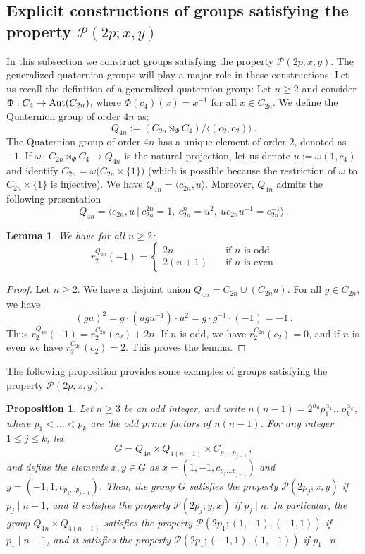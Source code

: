 \documentclass[12pt]{amsart}
\numberwithin{equation}{section}
\newcommand{\Aut}{{\rm Aut}}
\newtheorem{lem}[X]{Lemma}
\newtheorem{prop}[X]{Proposition}
\theoremstyle{definition}
\theoremstyle{remark}
\begin{document}
\subsection{Explicit constructions of groups satisfying the property $\mathcal{P}(2p;x,y)$}\label{subsec:Prop(2p)}
In this subsection we construct groups satisfying the property $\mathcal{P}(2p;x,y)$. The generalized quaternion groups will play a major role in these constructions. Let us recall the definition of a generalized quaternion group: Let $n\ge 2$ and consider $\Phi: C_4\to \Aut(C_{2n})$, where $\Phi(c_4)(x)=x^{-1}$ for all $x\in C_{2n}$. We define the Quaternion group of order $4n$ as:
\begin{equation}
    Q_{4n}:= (C_{2n} \rtimes_{\Phi}C_4)/\langle(c_2,c_2)\rangle\, .
\end{equation}
The Quaternion group of order $4n$ has a unique element of order $2$, denoted as $-1$. If $\omega\, \colon\,  C_{2n} \rtimes_{\Phi}C_4\to Q_{4n}$ is the natural projection, let us denote $u:=\omega(1,c_4)$ and identify $C_{2n}=\omega\bigl( C_{2n}\times\{1\}\bigr)$ (which is possible because the restriction of $\omega$ to $C_{2n}\times \{1\}$ is injective). We have $Q_{4n}=\langle c_{2n}, u\rangle$. Moreover, $Q_{4n}$ admits the following presentation \[ Q_{4n}=\bigl\langle c_{2n},u \ |\ c_{2n}^{2n}=1,\  c_{2n}^{n}=u^2,\ uc_{2n}u^{-1}=c_{2n}^{-1}\bigr\rangle\, .\]
\begin{lem}\label{rootsnumberinQ4n}
    We have for all $n\ge 2$: 
    \[ r_2^{Q_{4n}}(-1)=\begin{cases}
        2n\quad&\text{if } n\text{ is odd}\\
        2(n+1)\quad &\text{if }n\text{ is even}
    \end{cases}\]
\end{lem}
\begin{proof}
    Let $n\ge2$. We have a disjoint union $Q_{4n}=C_{2n} \cup (C_{2n} u)$. For all $g\in C_{2n}$, we have \[(gu)^2=g\cdot (ugu^{-1}) \cdot u^2=g\cdot g^{-1} \cdot (-1)=-1\, .\]
    Thus $r_2^{Q_{4n}}(-1)=r_{2}^{C_{2n}}(c_2)+2n$. If $n$ is odd, we have $r_2^{C_{2n}}(c_{2})=0$, and if $n$ is even we have $r_2^{C_{2n}}(c_{2})=2$. This proves the lemma.
\end{proof}
\noindent The following proposition provides some examples of groups satisfying the property $\mathcal{P}(2p;x,y)$.
\begin{prop}\label{general-construction}
    Let $n\ge 3$ be an odd integer, and write $n(n-1)=2^{\alpha_0} p_1^{\alpha_1}\dots p_k^{\alpha_k}$, where $p_1<\dots<p_k$ are the odd prime factors of $n(n-1)$. For any integer $1\le j\le k$, let 
    \[ G=Q_{4n}\times Q_{4(n-1)}\times C_{p_1\dots p_{j-1}}\, , \]
    and define the elements $x,y\in G$ as $x=(1,-1,c_{p_1\dots p_{j-1}})$ and $y=(-1,1,c_{p_1\dots p_{j-1}})$. Then, the group $G$ satisfies the property $\mathcal{P}(2p_j;x,y)$ if $p_j \mid n-1$, and it satisfies the property $\mathcal{P}(2p_j;y,x)$ if $p_j \mid n$. In particular, the group $Q_{4n}\times Q_{4(n-1)}$ satisfies the property $\mathcal{P}(2p_1;(1,-1),(-1,1))$ if $p_1 \mid n-1$, and it satisfies the property $\mathcal{P}(2p_1;(-1,1),(1,-1))$ if $p_1 \mid n$.
\end{prop}
\end{document}
